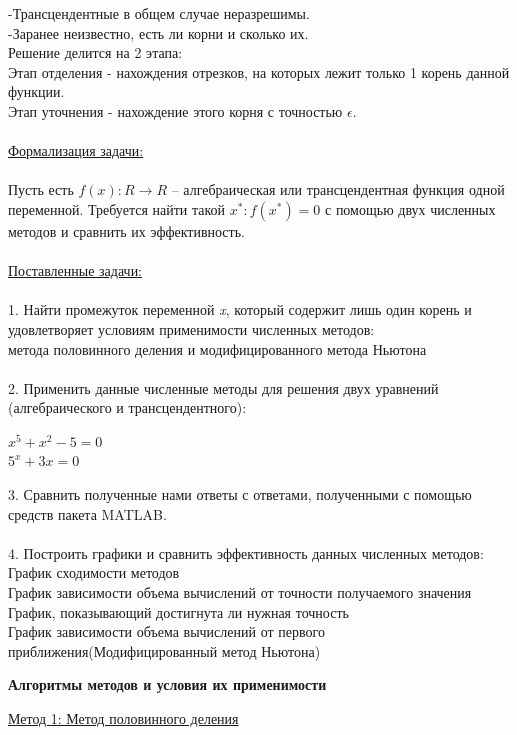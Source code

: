 \documentclass{article}
\begin{document}
	-Трансцендентные в общем случае неразрешимы.\\
	-Заранее неизвестно, есть ли корни и сколько их.\\
	Решение делится на 2 этапа:\\
	Этап отделения - нахождения отрезков, на которых лежит только 1 корень данной функции.\\
	Этап уточнения - нахождение этого корня с точностью $\epsilon$.\\
	\\
	\underline{Формализация задачи:}\\
	\\
	Пусть есть $f(x): R\rightarrow R$ – алгебраическая или трансцендентная функция одной переменной. Требуется найти такой $x^*: f(x^*) = 0$ с помощью двух численных методов и сравнить их эффективность.\\
	\\
	\underline{Поставленные задачи:}\\
	\\
	1. Найти промежуток переменной \textit{x}, который содержит лишь один корень и удовлетворяет условиям применимости численных методов:\\
	метода половинного деления и модифицированного метода Ньютона\\
	\\
	2. Применить данные численные методы для решения двух уравнений (алгебраического и трансцендентного):
	\begin{center} $x^5 + x^2 - 5 = 0$\\
		$5^x + 3x = 0$\\
	\end{center}
	3. Сравнить полученные нами ответы с ответами, полученными с помощью средств пакета MATLAB.\\
	\\
	4. Построить графики и сравнить эффективность данных численных методов:\\
	График сходимости методов\\
	График зависимости объема вычислений от точности получаемого значения\\
	График, показывающий достигнута ли нужная точность\\
	График зависимости объема вычислений от первого приближения(Модифицированный метод Ньютона)\\
	\newpage
	\begin{center} \textbf{Алгоритмы методов и условия их применимости}\end{center}
	\underline{Метод 1: Метод половинного деления}\\
\end{document}
